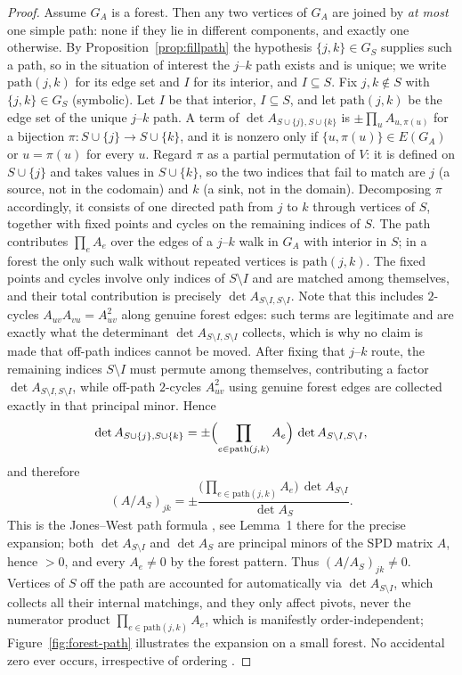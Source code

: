 \documentclass[11pt]{article}
\theoremstyle{plain}
\theoremstyle{definition}
\begin{document}
\begin{aiblock}
\begin{proof}
Assume $G_A$ is a forest. Then any two vertices of $G_A$ are joined by \emph{at most} one simple
path: none if they lie in different components, and exactly one otherwise. By
Proposition~\ref{prop:fillpath} the hypothesis $\{j,k\}\in G_S$ supplies such a path, so in the
situation of interest the $j$--$k$ path exists and is unique; we write $\mathrm{path}(j,k)$ for its
edge set and $I$ for its interior, and $I\subseteq S$. Fix $j,k\notin S$ with $\{j,k\}\in G_S$ (symbolic). Let $I$ be that interior, $I\subseteq S$, and let $\mathrm{path}(j,k)$ be the edge set of the unique $j$--$k$ path. A term of
$\det A_{S\cup\{j\},S\cup\{k\}}$ is $\pm\prod_{u}A_{u,\pi(u)}$ for a bijection
$\pi:S\cup\{j\}\to S\cup\{k\}$, and it is nonzero only if $\{u,\pi(u)\}\in E(G_A)$ or $u=\pi(u)$ for
every $u$. Regard $\pi$ as a partial permutation of $V$: it is defined on $S\cup\{j\}$ and takes values
in $S\cup\{k\}$, so the two indices that fail to match are $j$ (a source, not in the codomain) and $k$
(a sink, not in the domain). Decomposing $\pi$ accordingly, it consists of one directed path from $j$
to $k$ through vertices of $S$, together with fixed points and cycles on the remaining indices of $S$.
The path contributes $\prod_{e}A_e$ over the edges of a $j$--$k$ walk in $G_A$ with interior in $S$;
in a forest the only such walk without repeated vertices is $\mathrm{path}(j,k)$. The fixed points and
cycles involve only indices of $S\setminus I$ and are matched among themselves, and their total
contribution is precisely $\det A_{S\setminus I,S\setminus I}$. Note that this includes $2$-cycles
$A_{uv}A_{vu}=A_{uv}^2$ along genuine forest edges: such terms are legitimate and are exactly what the
determinant $\det A_{S\setminus I,S\setminus I}$ collects, which is why no claim is made that off-path
indices cannot be moved. After fixing that $j$--$k$ route, the remaining indices $S\setminus I$ must permute among themselves, contributing a factor $\det A_{S\setminus I,S\setminus I}$, while off-path $2$-cycles $A_{uv}^2$ using genuine forest edges are collected exactly in that principal minor. Hence
\[
\det A_{S\cup\{j\},S\cup\{k\}} = \pm\Bigl(\prod_{e\in\mathrm{path}(j,k)} A_e\Bigr)\,\det A_{S\setminus I,S\setminus I},
\]
and therefore
\[
(A/A_S)_{jk}= \pm\frac{\bigl(\prod_{e\in\mathrm{path}(j,k)} A_e\bigr)\,\det A_{S\setminus I}}{\det A_{S}}.
\]
This is the Jones--West path formula \cite{Jones}, see Lemma~1 there for the precise expansion; both $\det A_{S\setminus I}$ and $\det A_{S}$ are principal minors of the SPD matrix $A$, hence $>0$, and every $A_e\neq0$ by the forest pattern. Thus $(A/A_S)_{jk}\neq0$. Vertices of $S$ off the path are accounted for automatically via $\det A_{S\setminus I}$, which collects all their internal matchings, and they only affect pivots, never the numerator product $\prod_{e\in\mathrm{path}(j,k)} A_e$, which is manifestly order-independent; Figure~\ref{fig:forest-path} illustrates the expansion on a
small forest. No accidental zero ever occurs, irrespective of ordering \cite{Malouche,Jones}.
\end{proof}


\end{aiblock}
\end{document}
